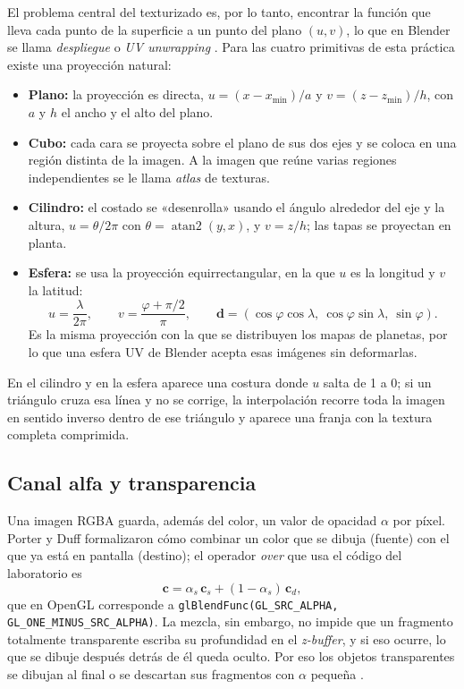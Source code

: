 El problema central del texturizado es, por lo tanto, encontrar la función que lleva cada punto de la superficie a un punto del plano $(u, v)$, lo que en Blender se llama \textit{despliegue} o \textit{UV unwrapping} \cite{blender_manual}. Para las cuatro primitivas de esta práctica existe una proyección natural:
\begin{itemize}
    \item \textbf{Plano:} la proyección es directa, $u = (x - x_{\min})/a$ y $v = (z - z_{\min})/h$, con $a$ y $h$ el ancho y el alto del plano.
    \item \textbf{Cubo:} cada cara se proyecta sobre el plano de sus dos ejes y se coloca en una región distinta de la imagen. A la imagen que reúne varias regiones independientes se le llama \textit{atlas} de texturas.
    \item \textbf{Cilindro:} el costado se «desenrolla» usando el ángulo alrededor del eje y la altura, $u = \theta/2\pi$ con $\theta = \operatorname{atan2}(y, x)$, y $v = z/h$; las tapas se proyectan en planta.
    \item \textbf{Esfera:} se usa la proyección equirrectangular, en la que $u$ es la longitud y $v$ la latitud:
    \begin{equation}
        u = \frac{\lambda}{2\pi}, \qquad v = \frac{\varphi + \pi/2}{\pi},
        \qquad \mathbf{d} = (\cos\varphi\cos\lambda,\ \cos\varphi\sin\lambda,\ \sin\varphi).
    \end{equation}
    Es la misma proyección con la que se distribuyen los mapas de planetas, por lo que una esfera UV de Blender acepta esas imágenes sin deformarlas.
\end{itemize}
En el cilindro y en la esfera aparece una costura donde $u$ salta de 1 a 0; si un triángulo cruza esa línea y no se corrige, la interpolación recorre toda la imagen en sentido inverso dentro de ese triángulo y aparece una franja con la textura completa comprimida.

\subsection*{Canal alfa y transparencia}
Una imagen RGBA guarda, además del color, un valor de opacidad $\alpha$ por píxel. Porter y Duff \cite{porter1984} formalizaron cómo combinar un color que se dibuja (fuente) con el que ya está en pantalla (destino); el operador \textit{over} que usa el código del laboratorio es
\begin{equation}
    \mathbf{c} = \alpha_s\,\mathbf{c}_s + (1 - \alpha_s)\,\mathbf{c}_d,
\end{equation}
que en OpenGL corresponde a \texttt{glBlendFunc(GL\_SRC\_ALPHA, GL\_ONE\_MINUS\_SRC\_ALPHA)}. La mezcla, sin embargo, no impide que un fragmento totalmente transparente escriba su profundidad en el \textit{z-buffer}, y si eso ocurre, lo que se dibuje después detrás de él queda oculto. Por eso los objetos transparentes se dibujan al final o se descartan sus fragmentos con $\alpha$ pequeña \cite{akenine2018}.

